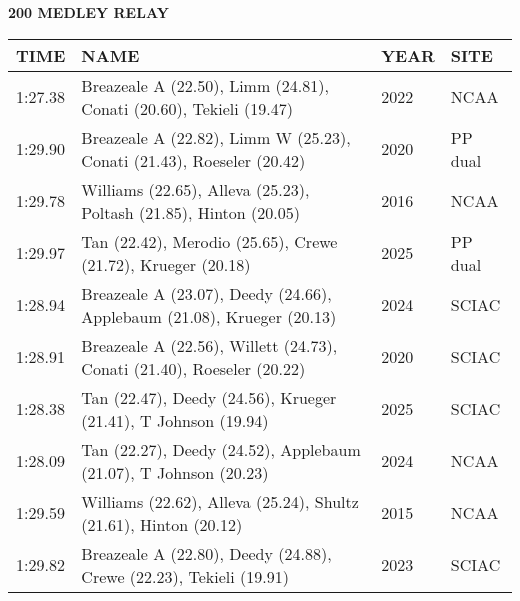 \begin{center}
\begin{minipage}[t]{0.7\textwidth}
\centering
\textbf{200 MEDLEY RELAY}\\[0.05cm]
\begin{tabular}{@{}p{1.8cm}p{2.8cm}p{1.2cm}p{1.4cm}@{}}
\hline
\textbf{TIME} & \textbf{NAME} & \textbf{YEAR} & \textbf{SITE} \\
\hline
1:27.38 & Breazeale A (22.50), Limm (24.81), Conati (20.60), Tekieli (19.47) & 2022 & NCAA \\
1:29.90 & Breazeale A (22.82), Limm W (25.23), Conati (21.43), Roeseler (20.42) & 2020 & PP dual \\
1:29.78 & Williams (22.65), Alleva (25.23), Poltash (21.85), Hinton (20.05) & 2016 & NCAA \\
1:29.97 & Tan (22.42), Merodio (25.65), Crewe (21.72), Krueger (20.18) & 2025 & PP dual \\
1:28.94 & Breazeale A (23.07), Deedy (24.66), Applebaum (21.08), Krueger (20.13) & 2024 & SCIAC \\
1:28.91 & Breazeale A (22.56), Willett (24.73), Conati (21.40), Roeseler (20.22) & 2020 & SCIAC \\
1:28.38 & Tan (22.47), Deedy (24.56), Krueger (21.41), T Johnson (19.94) & 2025 & SCIAC \\
1:28.09 & Tan (22.27), Deedy (24.52), Applebaum (21.07), T Johnson (20.23) & 2024 & NCAA \\
1:29.59 & Williams (22.62), Alleva (25.24), Shultz (21.61), Hinton (20.12) & 2015 & NCAA \\
1:29.82 & Breazeale A (22.80), Deedy (24.88), Crewe (22.23), Tekieli (19.91) & 2023 & SCIAC \\
\hline
\end{tabular}
\end{minipage}
\end{center}

\vspace{0.4cm}

